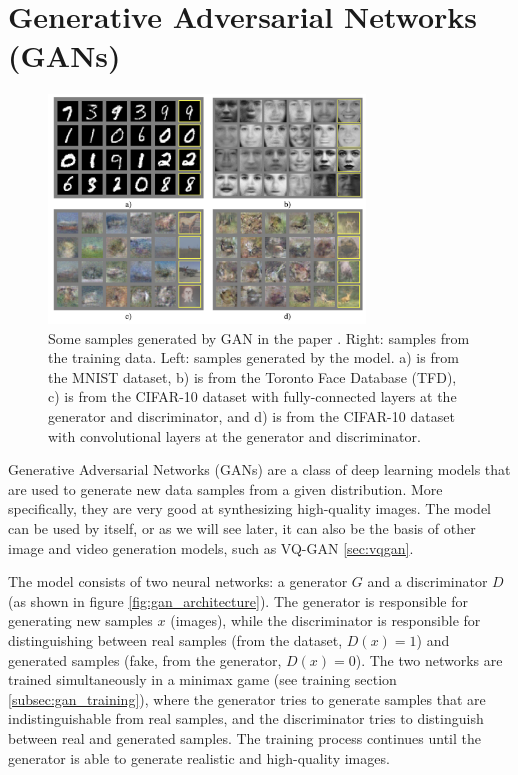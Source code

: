 \section{Generative Adversarial Networks (GANs)}
\label{sec:gan}

\begin{figure}
    \centering
    \includegraphics[width=0.75\textwidth]{images/gan_samples.png}
    \caption{Some samples generated by GAN in the paper \cite{gan}. Right: samples from the training data. Left: samples generated by the model. a) is from the MNIST dataset, b) is from the Toronto Face Database (TFD), c) is from the CIFAR-10 dataset with fully-connected layers at the generator and discriminator, and d) is from the CIFAR-10 dataset with convolutional layers at the generator and discriminator.}
\end{figure}

Generative Adversarial Networks (GANs) \cite{gan} are a class of deep learning models that are used to generate new data samples from a given distribution. More specifically, they are very good at synthesizing high-quality images. The model can be used by itself, or as we will see later, it can also be the basis of other image and video generation models, such as VQ-GAN \ref{sec:vqgan}.



The model consists of two neural networks: a generator $G$ and a discriminator $D$ (as shown in figure \ref{fig:gan_architecture}). The generator is responsible for generating new samples $x$ (images), while the discriminator is responsible for distinguishing between real samples (from the dataset, $D(x) = 1$) and generated samples (fake, from the generator, $D(x) = 0$). The two networks are trained simultaneously in a minimax game (see training section \ref{subsec:gan_training}), where the generator tries to generate samples that are indistinguishable from real samples, and the discriminator tries to distinguish between real and generated samples. The training process continues until the generator is able to generate realistic and high-quality images. 

